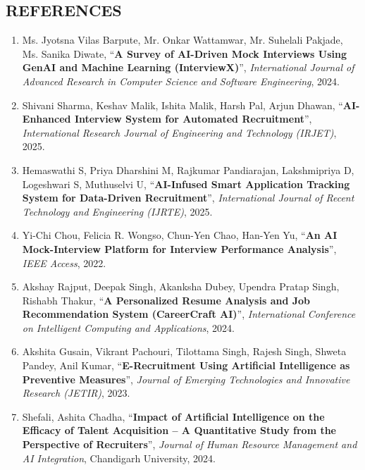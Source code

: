 \documentclass[a4paper, 12pt]{report}
\begin{document}
\begin{center}
   \chapter*{REFERENCES}

\begin{enumerate}
    \item Ms. Jyotsna Vilas Barpute, Mr. Onkar Wattamwar, Mr. Suhelali Pakjade, Ms. Sanika Diwate,  
    “\textbf{A Survey of AI-Driven Mock Interviews Using GenAI and Machine Learning (InterviewX)}”,  
    \textit{International Journal of Advanced Research in Computer Science and Software Engineering},  
    2024.

    \item Shivani Sharma, Keshav Malik, Ishita Malik, Harsh Pal, Arjun Dhawan,  
    “\textbf{AI-Enhanced Interview System for Automated Recruitment}”,  
    \textit{International Research Journal of Engineering and Technology (IRJET)},  
    2025.

    \item Hemaswathi S, Priya Dharshini M, Rajkumar Pandiarajan, Lakshmipriya D, Logeshwari S, Muthuselvi U,  
    “\textbf{AI-Infused Smart Application Tracking System for Data-Driven Recruitment}”,  
    \textit{International Journal of Recent Technology and Engineering (IJRTE)},  
    2025.

    \item Yi-Chi Chou, Felicia R. Wongso, Chun-Yen Chao, Han-Yen Yu,  
    “\textbf{An AI Mock-Interview Platform for Interview Performance Analysis}”,  
    \textit{IEEE Access},  
    2022.

    \item Akshay Rajput, Deepak Singh, Akanksha Dubey, Upendra Pratap Singh, Rishabh Thakur,  
    “\textbf{A Personalized Resume Analysis and Job Recommendation System (CareerCraft AI)}”,  
    \textit{International Conference on Intelligent Computing and Applications},  
    2024.

    \item Akshita Gusain, Vikrant Pachouri, Tilottama Singh, Rajesh Singh, Shweta Pandey, Anil Kumar,  
    “\textbf{E-Recruitment Using Artificial Intelligence as Preventive Measures}”,  
    \textit{Journal of Emerging Technologies and Innovative Research (JETIR)},  
    2023.

    \item Shefali, Ashita Chadha,  
    “\textbf{Impact of Artificial Intelligence on the Efficacy of Talent Acquisition – A Quantitative Study from the Perspective of Recruiters}”,  
    \textit{Journal of Human Resource Management and AI Integration},  
    Chandigarh University, 2024.


\end{enumerate}
\end{center}
\end{document}
